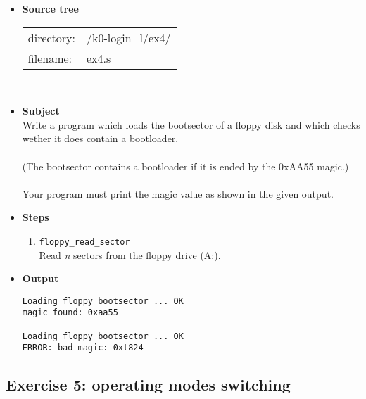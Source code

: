 {\begin{itemize}
\item {\bf Source tree}\\
\begin{tabular}{p{4cm}l}
directory: & /k0-login\_l/ex4/\\
filename: & ex4.s
\end{tabular}
\\
\item {\bf Subject}\\
Write a program which loads the bootsector of a floppy disk and which checks wether it does contain a bootloader.\\
\\
(The bootsector contains a bootloader if it is ended by the 0xAA55 magic.)\\
\\
Your program must print the magic value as shown in the given output.\\
\item {\bf Steps}
  \begin{enumerate}
  \item {\tt floppy\_read\_sector}\\
  Read {\em n} sectors from the floppy drive (A:).
  \\
  \end{enumerate}
\item {\bf Output}
\begin{verbatim}
Loading floppy bootsector ... OK
magic found: 0xaa55

Loading floppy bootsector ... OK
ERROR: bad magic: 0xt824
\end{verbatim}
\end{itemize}

\newpage

\subsection*{Exercise 5: operating modes switching}

}
